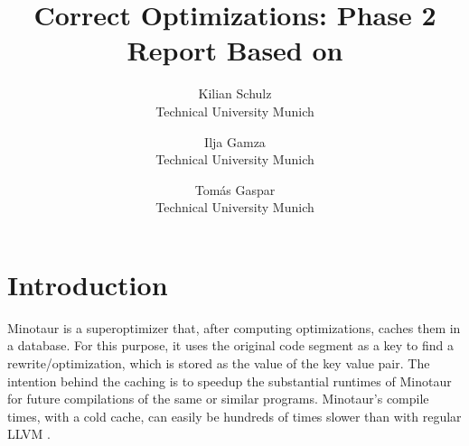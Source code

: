  
 \usepackage{tikz}
 \usetikzlibrary{
  arrows.meta,
  positioning,
  fit,
  calc
}
 \usepackage{amsmath}
 \usepackage{listings}
 \usepackage{enumitem}

 

 	\date{}
 	
 	\title{\Large \bf  Correct Optimizations: Phase 2 Report Based on  \cite{liu24:minotaur}}
 	
 	\author{
 		{\rm Kilian Schulz}\\
 		Technical University Munich
 		\and
 		{\rm Ilja Gamza}\\
 		Technical University Munich
 		\and
 		{\rm Tomás Gaspar}\\
 		Technical University Munich
 	} %
 	
 	\maketitle
 	
 	
 	
 	\section{Introduction}
	Minotaur \cite{liu24:minotaur} is a superoptimizer that, after computing optimizations, caches them in a database.
	For this purpose, it uses the original code segment as a key to find a rewrite/optimization, which is stored as the value of the key value pair.
	The intention behind the caching is to speedup the substantial runtimes of Minotaur for future compilations of the same or similar programs.
	Minotaur's compile times, with a cold cache, can easily be hundreds of times slower than with regular LLVM \cite{liu24:minotaur}.
	
